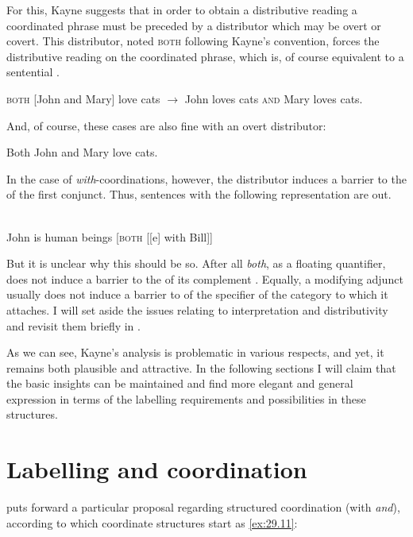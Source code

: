 \documentclass[output=paper]{langsci/langscibook}
\begin{document}
\label{sfrenchs}
\z

 For this, Kayne suggests that in order to obtain a distributive reading a coordinated phrase must be preceded by a distributor which may be overt or covert. This distributor, noted \textsc{both} following Kayne's convention, forces the distributive reading on the coordinated phrase, which is, of course equivalent to a sentential .

 \ea\label{ex:29.8}
    \textsc{both} [John and Mary] love cats $\rightarrow$ John loves cats \textsc{and} Mary loves cats.
\z

 And, of course, these cases are also fine with an overt distributor:

\ea\label{ex:29.9}
    Both John and Mary love cats.
\z

In the case of \emph{with}-coordinations, however, the distributor induces a
barrier to the  of the first conjunct. Thus, sentences with the
following representation are out.

\ea\label{kex}\parencite[66, example 56]{Kayne1994}\\
    John is human beings [\textsc{both} [[e] with Bill]]
\z

But it is unclear why this should be so. After all \emph{both}, as a floating
quantifier, does not induce a barrier to the  of its complement
\citep[cf.][]{sportiche:88}. Equally, a modifying adjunct usually does not
induce a barrier to  of the specifier of the category to which it
attaches. I will set aside the issues relating to interpretation and
distributivity and revisit them briefly in .

As we can see, Kayne's analysis is problematic in various respects, and yet, it
remains both plausible and attractive. In the following sections I will claim
that the basic insights can be maintained and find more elegant and general
expression in terms of the labelling requirements and possibilities in these
structures.

\section{Labelling and coordination} \label{laco}

\citet{Chomsky2013} puts forward a particular proposal regarding structured
coordination (with \emph{and}), according to which coordinate structures start
as \eqref{ex:29.11}:
\end{document}
